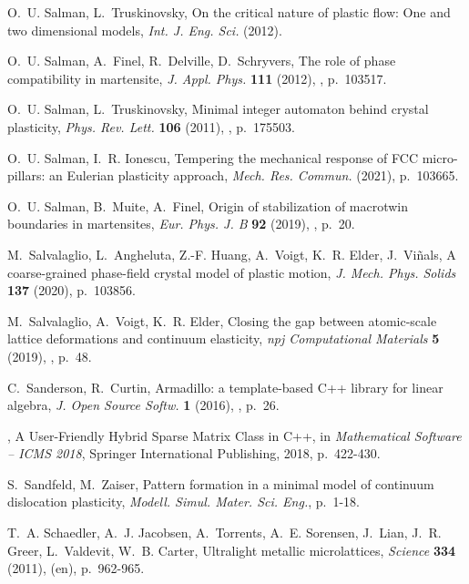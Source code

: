 \documentclass[CRPHYS,Unicode,manuscript]{cedram}
\begin{document}
\begin{thebibliography}{100}
O.~U. Salman, L.~Truskinovsky, {\og On the critical nature of plastic flow: One
  and two dimensional models\fg}, \emph{Int. J. Eng. Sci.} (2012).

O.~U. Salman, A.~Finel, R.~Delville, D.~Schryvers, {\og The role of phase
  compatibility in martensite\fg}, \emph{J. Appl. Phys.} \textbf{111} (2012),
  , p.~103517.

O.~U. Salman, L.~Truskinovsky, {\og Minimal integer automaton behind crystal
  plasticity\fg}, \emph{Phys. Rev. Lett.} \textbf{106} (2011), ,
  p.~175503.

O.~U. Salman, I.~R. Ionescu, {\og Tempering the mechanical response of {FCC}
  micro-pillars: an Eulerian plasticity approach\fg}, \emph{Mech. Res. Commun.}
  (2021), p.~103665.

O.~U. Salman, B.~Muite, A.~Finel, {\og Origin of stabilization of macrotwin
  boundaries in martensites\fg}, \emph{Eur. Phys. J. B} \textbf{92} (2019),
  , p.~20.

M.~Salvalaglio, L.~Angheluta, Z.-F. Huang, A.~Voigt, K.~R. Elder,
  J.~Vi{\~n}als, {\og A coarse-grained phase-field crystal model of plastic
  motion\fg}, \emph{J. Mech. Phys. Solids} \textbf{137} (2020), p.~103856.

M.~Salvalaglio, A.~Voigt, K.~R. Elder, {\og Closing the gap between
  atomic-scale lattice deformations and continuum elasticity\fg}, \emph{npj
  Computational Materials} \textbf{5} (2019), , p.~48.

C.~Sanderson, R.~Curtin, {\og Armadillo: a template-based C++ library for
  linear algebra\fg}, \emph{J. Open Source Softw.} \textbf{1} (2016),
  , p.~26.

\bysame , {\og A {User-Friendly} Hybrid Sparse Matrix Class in C++\fg}, in
  \emph{Mathematical Software -- {ICMS} 2018}, Springer International
  Publishing, 2018, p.~422-430.

S.~Sandfeld, M.~Zaiser, {\og Pattern formation in a minimal model of continuum
  dislocation plasticity\fg}, \emph{Modell. Simul. Mater. Sci. Eng.}, p.~1-18.

T.~A. Schaedler, A.~J. Jacobsen, A.~Torrents, A.~E. Sorensen, J.~Lian, J.~R.
  Greer, L.~Valdevit, W.~B. Carter, {\og Ultralight metallic microlattices\fg},
  \emph{Science} \textbf{334} (2011),  (en), p.~962-965.


\end{thebibliography}
\end{document}
